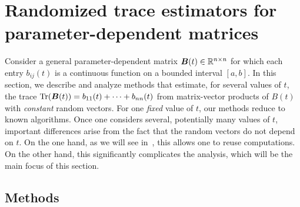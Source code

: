 \section{Randomized trace estimators for parameter-dependent matrices}
\label{sec:analysis}

\color{blue}
Consider a general parameter-dependent matrix
$\boldsymbol{B}(t) \in \mathbb{R}^{n \times n}$ for which each
entry $b_{ij}(t)$ is a 
continuous function on a bounded interval $[a,b]$. In this section, we 
describe and analyze methods that estimate, for several values of $t$, the 
trace $\operatorname{Tr}(\boldsymbol{B}(t)) = b_{11}(t)+ \cdots + b_{nn}(t)$
from matrix-vector products of $B(t)$ with \emph{constant} random vectors. For one \emph{fixed} value of $t$, our methods reduce to known algorithms. Once one considers several, potentially many values of $t$, important differences arise from the fact that the random vectors do not depend on $t$. On the one hand, as we will see in~, this allows one to reuse computations. On the other hand, this significantly complicates the analysis, which will be the main focus of this section.

\subsection{Methods}
\label{subsec:methods}

